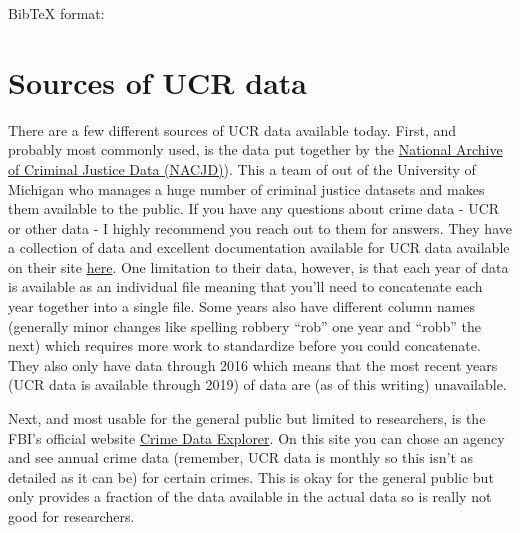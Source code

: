 \documentclass[
  12pt,
]{book}
\begin{document}
BibTeX format:

\hypertarget{sources-of-ucr-data}{%
\section*{Sources of UCR data}\label{sources-of-ucr-data}}

There are a few different sources of UCR data available today. First, and probably most commonly used, is the data put together by the \href{https://www.icpsr.umich.edu/web/pages/NACJD/index.html}{National Archive of Criminal Justice Data (NACJD)}). This a team of out of the University of Michigan who manages a huge number of criminal justice datasets and makes them available to the public. If you have any questions about crime data - UCR or other data - I highly recommend you reach out to them for answers. They have a collection of data and excellent documentation available for UCR data available on their site \href{https://www.icpsr.umich.edu/web/NACJD/series/57}{here}. One limitation to their data, however, is that each year of data is available as an individual file meaning that you'll need to concatenate each year together into a single file. Some years also have different column names (generally minor changes like spelling robbery ``rob'' one year and ``robb'' the next) which requires more work to standardize before you could concatenate. They also only have data through 2016 which means that the most recent years (UCR data is available through 2019) of data are (as of this writing) unavailable.

Next, and most usable for the general public but limited to researchers, is the FBI's official website \href{https://crime-data-explorer.fr.cloud.gov/}{Crime Data Explorer}. On this site you can chose an agency and see annual crime data (remember, UCR data is monthly so this isn't as detailed as it can be) for certain crimes. This is okay for the general public but only provides a fraction of the data available in the actual data so is really not good for researchers.
\end{document}
